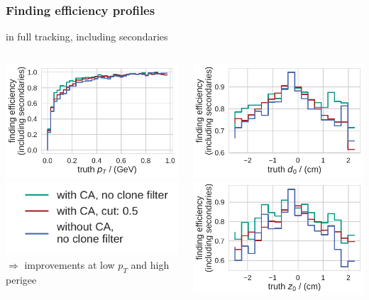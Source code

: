 \documentclass[18pt, aspectratio=169]{beamer}
\begin{document}
\begin{frame}
  \frametitle{Finding efficiency profiles}
  in full tracking, including secondaries
  \begin{columns}
    \begin{column}{.5\textwidth}
      \centering
      \includegraphics[width=.7\textwidth]{figures/findeff_secondaries_by_pt_truth_fullreco_trainedWithFakes.pdf}\\
      \includegraphics[width=.7\textwidth]{figures/legend_fom_profile.pdf}\\
      $\Rightarrow$ improvements at low $p_T$ and high perigee
    \end{column}    
    \begin{column}{.5\textwidth}
      \centering
      \includegraphics[width=.7\textwidth]{figures/findeff_secondaries_by_d0_truth_fullreco_trainedWithFakes.pdf}\\
      \includegraphics[width=.7\textwidth]{figures/findeff_secondaries_by_z0_truth_fullreco_trainedWithFakes.pdf}

\end{column}
\end{columns}
\end{frame}
\end{document}
